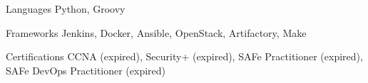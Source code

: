 
\begin{cvskills}
  \cvskill
    {Languages} %
    {Python, Groovy} %

  \cvskill
    {Frameworks} %
    {
        Jenkins,
        Docker,
        Ansible,
        OpenStack,
        Artifactory,
        Make
    } %

  \cvskill
    {Certifications}
    {CCNA (expired), Security+ (expired), SAFe Practitioner (expired), SAFe DevOps Practitioner (expired)}

\end{cvskills}
